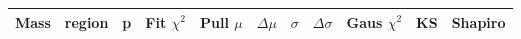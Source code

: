 \def\tableCaption{Statistical quantities for SM MC fit}

\begin{table}[!htbp]
   \begin{center}
      \begin{tabular}{ll
         S[round-mode = figures, round-precision = 1]
         S[round-mode = figures, round-precision = 2]|
         S[round-mode = figures, round-precision = 2]
         S[round-mode = figures, round-precision = 2]
         S[round-mode = figures, round-precision = 2]
         S[round-mode = figures, round-precision = 2]
         S[round-mode = figures, round-precision = 2]
         S[round-mode = figures, round-precision = 2]
         S[round-mode = figures, round-precision = 2]
         }
         \toprule
         {Mass} &{region} & {p} & {Fit $\chi^2$} & {Pull $\mu$} & {$\Delta\mu$} & {$\sigma$} & {$\Delta\sigma$} & {Gaus $\chi^2$} & {KS} & {Shapiro}  \\
         \midrule

\end{tabular}
\end{center}
\end{table}
